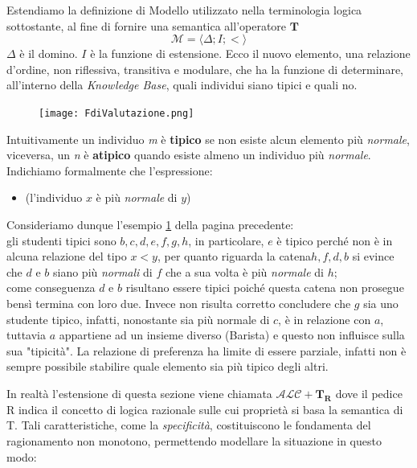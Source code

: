 Estendiamo la definizione di Modello utilizzato nella terminologia logica sottostante, 
al fine di fornire una semantica all'operatore $ \mathbf{T} $
\[ \mathcal{M} = \langle \Delta;I;< \rangle\]
$ \Delta $ è il domino. $ I $ è la funzione di estensione.
Ecco il nuovo elemento, una relazione d'ordine, non riflessiva, transitiva e modulare, che ha la funzione di determinare, all'interno della \textit{Knowledge Base}, quali individui siano tipici e quali no.
\begin{figure}[h]
	\texttt{[image: FdiValutazione.png]}
	\label{fig:valutaz}
	\centering
\end{figure}
\clearpage
Intuitivamente un individuo \textit{m} è \textbf{tipico} se non esiste alcun elemento più \textit{normale},
viceversa, un  \textit{n} è \textbf{atipico} quando esiste almeno un individuo più \textit{normale}.
Indichiamo formalmente che l'espressione:
\begin{itemize}
	\item[]  (l'individuo $ x $ è più \textit{normale} di $ y $)
\end{itemize}
Consideriamo dunque l'esempio \ref{fig:valutaz} della pagina precedente:\\
gli studenti tipici sono $ b,c,d,e,f,g,h $, in particolare, $ e $ è tipico perché non è in alcuna
relazione del tipo $ x < y $, per quanto riguarda la catena$  h, f, d, b $ si evince che $ d $ e $ b $ siano più
\textit{normali} di $ f $ che a sua volta è più \textit{normale} di $ h $;\\ 
come conseguenza $ d $ e $ b $ risultano essere tipici poiché questa catena non prosegue bensì termina con loro due. 
Invece non risulta corretto concludere che $ g $ sia uno studente tipico, infatti, nonostante sia 
più normale di $ c $, è in relazione con $ a $, tuttavia $ a $ appartiene 
ad un insieme diverso (Barista) e questo non influisce sulla sua "tipicità".
La relazione di preferenza ha limite di essere parziale, 
infatti non è sempre possibile stabilire quale elemento sia più tipico degli altri.

In realtà l’estensione di questa sezione viene chiamata $ \mathcal{ALC + \mathbf{T_{R}}} $ dove il pedice
R indica il concetto di logica razionale sulle cui proprietà si basa la semantica di
T. Tali caratteristiche, come la \textit{specificità}, costituiscono le fondamenta del ragionamento non monotono, 
permettendo modellare la situazione in questo modo:

